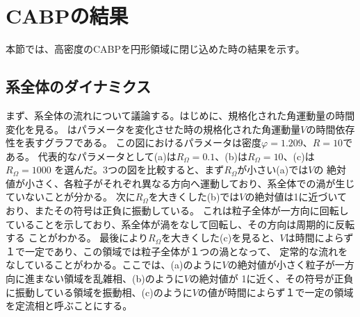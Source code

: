 \documentclass[/Users/ikedahajime/GitHub/reserch/master_report/thesis]{subfiles}
\begin{document}
\section{CABPの結果}\label{sec:result_cabp}
本節では、高密度のCABPを円形領域に閉じ込めた時の結果を示す。%
\subsection{系全体のダイナミクス}\label{subsec:CABPdinamicse}
まず、系全体の流れについて議論する。はじめに、規格化された角運動量の時間変化を見る。
はパラメータを変化させた時の規格化された角運動量$V$の時間依存性を表すグラフである。
この図におけるパラメータは密度$\varphi=1.209$、$R=10$である。
代表的なパラメータとして(a)は$R_{\Omega}=0.1$、(b)は$R_{\Omega}=10$、(c)は$R_{\Omega}=1000$
を選んだ。3つの図を比較すると、まず$R_{\Omega}$が小さい(a)では$V$の
絶対値が小さく、各粒子がそれぞれ異なる方向へ運動しており、系全体での渦が生じていないことが分かる。
次に$R_{\Omega}$を大きくした(b)では$V$の絶対値は1に近づいており、またその符号は正負に振動している。%
これは粒子全体が一方向に回転していることを示しており、系全体が渦をなして回転し、その方向は周期的に反転する
ことがわかる。
最後により$R_{\Omega}$を大きくした(c)を見ると、$V$は時間によらず１で一定であり、この領域では粒子全体が１つの渦となって、
定常的な流れをなしていることがわかる。ここでは、(a)のように$V$の絶対値が小さく粒子が一方向に進まない領域を乱雑相、(b)のように$V$の絶対値が
1に近く、その符号が正負に振動している領域を振動相、(c)のように$V$の値が時間によらず１で一定の領域を定流相と呼ぶことにする。
\end{document}
